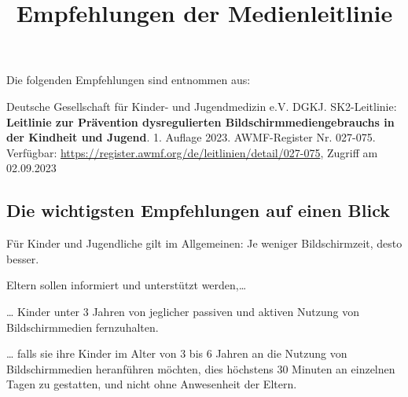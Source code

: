 \documentclass[
  letterpaper,
  DIV=11]{scrartcl}
\title{Empfehlungen der Medienleitlinie}
\author{}
\date{}
\renewcommand*\contentsname{Inhaltsverzeichnis}
\newcommand\contentsname{Inhaltsverzeichnis}
\begin{document}
\maketitle
\ifdefined\Shaded\renewenvironment{Shaded}{\begin{tcolorbox}[frame hidden, borderline west={3pt}{0pt}{shadecolor}, interior hidden, breakable, boxrule=0pt, enhanced, sharp corners]}{\end{tcolorbox}}\fi

\renewcommand*\contentsname{Inhaltsverzeichnis}
{
\hypersetup{linkcolor=}
\setcounter{tocdepth}{3}
\tableofcontents
}
\begin{tcolorbox}[enhanced jigsaw, left=2mm, leftrule=.75mm, colframe=quarto-callout-note-color-frame, rightrule=.15mm, colback=white, arc=.35mm, opacityback=0, breakable, bottomrule=.15mm, toprule=.15mm]
\begin{minipage}[t]{5.5mm}
\textcolor{quarto-callout-note-color}{\faInfo}
\end{minipage}%
\begin{minipage}[t]{\textwidth - 5.5mm}

Die folgenden Empfehlungen sind entnommen aus:

Deutsche Gesellschaft für Kinder- und Jugendmedizin e.V. DGKJ.
SK2-Leitlinie: \textbf{Leitlinie zur Prävention dysregulierten
Bildschirmmediengebrauchs in der Kindheit und Jugend}. 1. Auflage 2023.
AWMF-Register Nr. 027-075. Verfügbar:
\url{https://register.awmf.org/de/leitlinien/detail/027-075}, Zugriff am
02.09.2023

\end{minipage}%
\end{tcolorbox}

\hypertarget{sec-die-wichtigsten-empfehlungen-auf-einen-blick}{%
\subsection*{Die wichtigsten Empfehlungen auf einen
Blick}\label{sec-die-wichtigsten-empfehlungen-auf-einen-blick}}

Für Kinder und Jugendliche gilt im Allgemeinen: Je weniger
Bildschirmzeit, desto besser.

Eltern sollen informiert und unterstützt werden,\ldots{}

\ldots{} Kinder unter 3 Jahren von jeglicher passiven und aktiven
Nutzung von Bildschirmmedien fernzuhalten.

\ldots{} falls sie ihre Kinder im Alter von 3 bis 6 Jahren an die
Nutzung von Bildschirmmedien heranführen möchten, dies höchstens 30
Minuten an einzelnen Tagen zu gestatten, und nicht ohne Anwesenheit der
Eltern.
\end{document}
